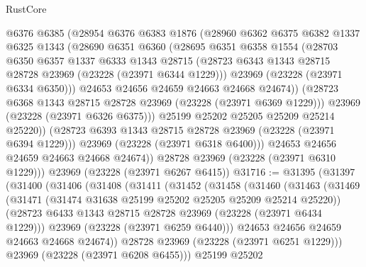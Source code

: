 \begin{lexlean}{RustCore}
\begin{coremodule}
              @6376
              @6385
              (@28954
                @6376
                @6383
                @1876
                (@28960
                  @6362
                  @6375
                  @6382
                  @1337
                  @6325
                  @1343
                  (@28690
                    @6351
                    @6360
                    (@28695
                      @6351
                      @6358
                      @1554
                      (@28703
                        @6350
                        @6357
                        @1337
                        @6333
                        @1343
                        @28715
                        (@28723 @6343 @1343 @28715 @28728 @23969 (@23228 (@23971 @6344 @1229)))
                        @23969
                        (@23228 (@23971 @6334 @6350)))
                      @24653
                      @24656
                      @24659
                      @24663
                      @24668
                      @24674))
                  (@28723 @6368 @1343 @28715 @28728 @23969 (@23228 (@23971 @6369 @1229)))
                  @23969
                  (@23228 (@23971 @6326 @6375)))
                @25199
                @25202
                @25205
                @25209
                @25214
                @25220))
            (@28723 @6393 @1343 @28715 @28728 @23969 (@23228 (@23971 @6394 @1229)))
            @23969
            (@23228 (@23971 @6318 @6400)))
          @24653
          @24656
          @24659
          @24663
          @24668
          @24674))
      @28728
      @23969
      (@23228 (@23971 @6310 @1229)))
    @23969
    (@23228 (@23971 @6267 @6415))
@31716 := @31395
    (@31397
      (@31400
        (@31406
          (@31408
            (@31411
              (@31452
                (@31458
                  (@31460
                    (@31463
                      (@31469
                        (@31471 (@31474 @31638 @25199 @25202 @25205 @25209 @25214 @25220))
                        (@28723 @6433 @1343 @28715 @28728 @23969 (@23228 (@23971 @6434 @1229)))
                        @23969
                        (@23228 (@23971 @6259 @6440)))
                      @24653
                      @24656
                      @24659
                      @24663
                      @24668
                      @24674))
                  @28728
                  @23969
                  (@23228 (@23971 @6251 @1229)))
                @23969
                (@23228 (@23971 @6208 @6455)))
              @25199
              @25202

\end{coremodule}
\end{lexlean}

